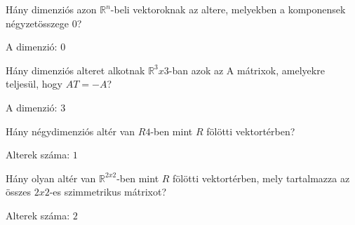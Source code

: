 \begin{frame}
  \begin{tcolorbox}[title={4/4. -R-}]
      Hány dimenziós azon $\mathbb{R}^n$-beli vektoroknak az altere, melyekben a komponensek négyzetösszege $0$?
  \tcblower

    \mmedskip 
    
    A dimenzió: $0$
  \end{tcolorbox}
\end{frame}


\begin{frame}
  \begin{tcolorbox}[title={4/5. -Q-}]
      Hány dimenziós alteret alkotnak $\mathbb{R}^3x3$-ban azok az A mátrixok, amelyekre teljesül, hogy $AT = −A$?
  \tcblower

    \mmedskip 
    
    A dimenzió: $3$
  \end{tcolorbox}
\end{frame}


\begin{frame}
  \begin{tcolorbox}[title={4/6. -R-}]
      Hány négydimenziós altér van $R4$-ben mint $R$ fölötti vektortérben?
  \tcblower

    \mmedskip 
    
    Alterek száma: $1$
  \end{tcolorbox}
\end{frame}


\begin{frame}
  \begin{tcolorbox}[title={4/7. -Q-}]
      Hány olyan altér van $\mathbb{R}^{2 x 2}$-ben mint $R$ fölötti vektortérben, mely tartalmazza az összes $2 x 2$-es szimmetrikus mátrixot?
  \tcblower

    \mmedskip 
    
    Alterek száma: $2$
  \end{tcolorbox}
\end{frame}


